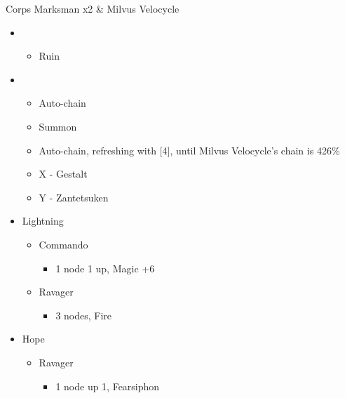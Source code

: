 \begin{paracol}{2}
	\begin{battle}{Corps Marksman x2 \& Milvus Velocycle}
		\begin{itemize}
			\item \first
			      \begin{itemize}
				      \item Ruin
			      \end{itemize}
			\item \fifth
			      \begin{itemize}
				      \item Auto-chain
				      \item Summon
				      \item Auto-chain, refreshing with [4], until Milvus Velocycle's chain is 426\%
				      \item X - Gestalt
				      \item Y - Zantetsuken
			      \end{itemize}
		\end{itemize}
	\end{battle}
	\switchcolumn*
	\begin{menu}
		\begin{itemize}
			\crystarium
			\begin{itemize}
				\item Lightning
				      \begin{itemize}
					      \item Commando
					            \begin{itemize}
						            \item 1 node 1 up, Magic +6
					            \end{itemize}
					      \item Ravager
					            \begin{itemize}
						            \item 3 nodes, Fire
					            \end{itemize}
				      \end{itemize}
				\item Hope
				      \begin{itemize}
					      \item Ravager
					            \begin{itemize}
						            \item 1 node up 1, Fearsiphon
					            \end{itemize}
				      \end{itemize}
			\end{itemize}

\end{itemize}
\end{menu}
\end{paracol}
